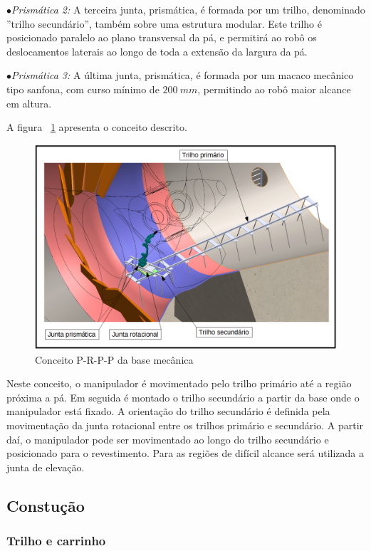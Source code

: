 $\bullet$\textit{Prismática 2:} A terceira junta,
prismática, é formada por um trilho, denominado ''trilho secundário'', também
sobre uma estrutura modular. Este trilho é posicionado paralelo ao plano
transversal da pá, e permitirá ao robô os deslocamentos laterais ao longo de toda a
extensão da largura da pá. 

$\bullet$\textit{Prismática 3:} A última junta, prismática, é formada por um
macaco mecânico tipo sanfona, com curso mínimo de $200~mm$, permitindo ao robô
maior alcance em altura.

A figura ~\ref{fig::conceito} apresenta o conceito descrito.

\begin{figure}[H]
	\centering
	\includegraphics[width=0.9\columnwidth]{figs/conceito/conceito_P-R-P-P_01_tags}
	\caption{Conceito P-R-P-P da base mecânica}
    \label{fig::conceito}
\end{figure}

Neste conceito, o manipulador é movimentado pelo trilho primário até a região
próxima a pá. Em seguida é montado o trilho secundário a partir da base onde o
manipulador está fixado. A orientação do trilho secundário é definida pela
movimentação da junta rotacional entre os trilhos primário e secundário. A
partir daí, o manipulador pode ser movimentado ao longo do trilho secundário e
posicionado para o revestimento. Para as regiões de difícil alcance será
utilizada a junta de elevação.

\subsection{Constução}

\subsubsection{Trilho e carrinho}

